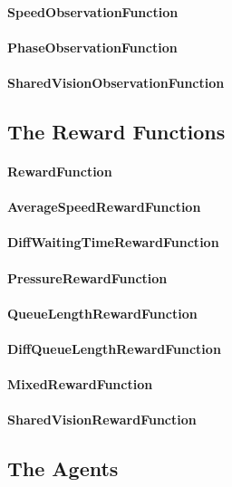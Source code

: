 \paragraph{SpeedObservationFunction}
\paragraph{PhaseObservationFunction}
\paragraph{SharedVisionObservationFunction}

\subsection{The Reward Functions}

\paragraph{RewardFunction}
\paragraph{AverageSpeedRewardFunction}
\paragraph{DiffWaitingTimeRewardFunction}
\paragraph{PressureRewardFunction}
\paragraph{QueueLengthRewardFunction}
\paragraph{DiffQueueLengthRewardFunction}
\paragraph{MixedRewardFunction}
\paragraph{SharedVisionRewardFunction}

\subsection{The Agents}

